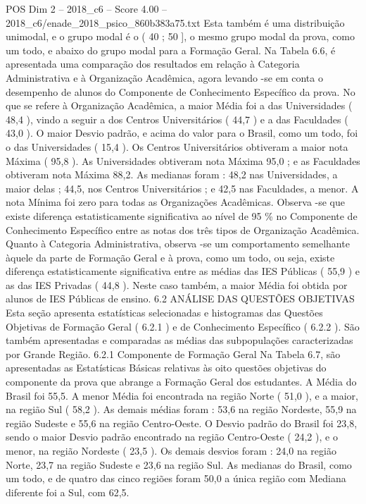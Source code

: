 \begin{textsample}{POS Dim 2 – 2018\_c6 – Score 4.00 – 2018\_c6/enade\_2018\_psico\_860b383a75.txt}
Esta também é uma distribuição unimodal, e o grupo modal é o ( 40 ; 50 ], o mesmo grupo modal da prova, como um todo, e abaixo do grupo modal para a Formação Geral.
Na Tabela 6.6, é apresentada uma comparação dos resultados em relação à Categoria Administrativa e à Organização Acadêmica, agora levando -se em conta o desempenho de alunos do Componente de Conhecimento Específico da prova.
No que se refere à Organização Acadêmica, a maior Média foi a das Universidades ( 48,4 ), vindo a seguir a dos Centros Universitários ( 44,7 ) e a das Faculdades ( 43,0 ).
O maior Desvio padrão, e acima do valor para o Brasil, como um todo, foi o das Universidades ( 15,4 ).
Os Centros Universitários obtiveram a maior nota Máxima ( 95,8 ).
As Universidades obtiveram nota Máxima 95,0 ; e as Faculdades obtiveram nota Máxima 88,2.
As medianas foram : 48,2 nas Universidades, a maior delas ; 44,5, nos Centros Universitários ; e 42,5 nas Faculdades, a menor.
A nota Mínima foi zero para todas as Organizações Acadêmicas.
Observa -se que existe diferença estatisticamente significativa ao nível de 95 \% no Componente de Conhecimento Específico entre as notas dos três tipos de Organização Acadêmica.
Quanto à Categoria Administrativa, observa -se um comportamento semelhante àquele da parte de Formação Geral e à prova, como um todo, ou seja, existe diferença estatisticamente significativa entre as médias das IES Públicas ( 55,9 ) e as das IES Privadas ( 44,8 ).
Neste caso também, a maior Média foi obtida por alunos de IES Públicas de ensino. 6.2 ANÁLISE DAS QUESTÕES OBJETIVAS Esta seção apresenta estatísticas selecionadas e histogramas das Questões Objetivas de Formação Geral ( 6.2.1 ) e de Conhecimento Específico ( 6.2.2 ).
São também apresentadas e comparadas as médias das subpopulações caracterizadas por Grande Região. 6.2.1 Componente de Formação Geral Na Tabela 6.7, são apresentadas as Estatísticas Básicas relativas às oito questões objetivas do componente da prova que abrange a Formação Geral dos estudantes.
A Média do Brasil foi 55,5.
A menor Média foi encontrada na região Norte ( 51,0 ), e a maior, na região Sul ( 58,2 ).
As demais médias foram : 53,6 na região Nordeste, 55,9 na região Sudeste e 55,6 na região Centro-Oeste.
O Desvio padrão do Brasil foi 23,8, sendo o maior Desvio padrão encontrado na região Centro-Oeste ( 24,2 ), e o menor, na região Nordeste ( 23,5 ).
Os demais desvios foram : 24,0 na região Norte, 23,7 na região Sudeste e 23,6 na região Sul.
As medianas do Brasil, como um todo, e de quatro das cinco regiões foram 50,0 a única região com Mediana diferente foi a Sul, com 62,5.

\end{textsample}
